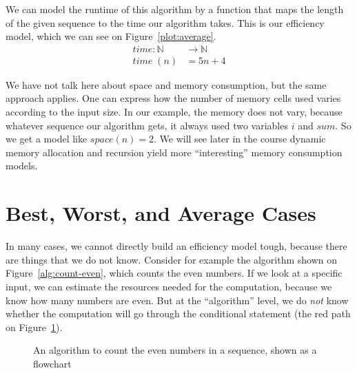 \documentclass{aldast}
\begin{document}
We can model the runtime of this algorithm by a function that maps the
length of the given sequence to the time our algorithm takes. This is
our efficiency model, which we can see on Figure~\ref{plot:average}.
\begin{align*}
  time : \mathbb{N} & \to \mathbb{N} \\
  time\; (n) & = 5n + 4
\end{align*}

We have not talk here about space and memory consumption, but the same
approach applies. One can express how the number of memory cells used
varies according to the input size. In our example, the memory does
not vary, because whatever sequence our algorithm gets, it always used
two variables $i$ and $sum$. So we get a model like $space(n) = 2$. We
will see later in the course dynamic memory allocation and recursion
yield more ``interesting'' memory consumption models.

\section{Best, Worst, and Average Cases}

In many cases, we cannot directly build an efficiency model tough,
because there are things that we do not know. Consider for example the
algorithm shown on Figure~\ref{alg:count-even}, which counts the even
numbers. If we look at a specific input, we can estimate the resources
needed for the computation, because we know how many numbers are
even. But at the ``algorithm'' level, we do \emph{not} know whether
the computation will go through the conditional statement (the red
path on Figure~\ref{fig:flowchart}).

\begin{figure}[htbp]
  
  \caption{An algorithm to count the even numbers in a sequence, shown as a flowchart}
  \label{fig:flowchart}
\end{figure}
\end{document}
